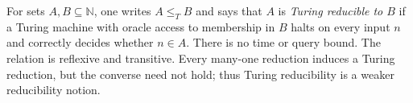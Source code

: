 
For sets $A,B\subseteq\mathbb N$, one writes $A\le_T B$ and says that $A$ is \emph{Turing reducible to $B$} if a Turing machine with oracle access to membership in $B$ halts on every input $n$ and correctly decides whether $n\in A$. There is no time or query bound. The relation is reflexive and transitive. Every many-one reduction induces a Turing reduction, but the converse need not hold; thus Turing reducibility is a weaker reducibility notion.

